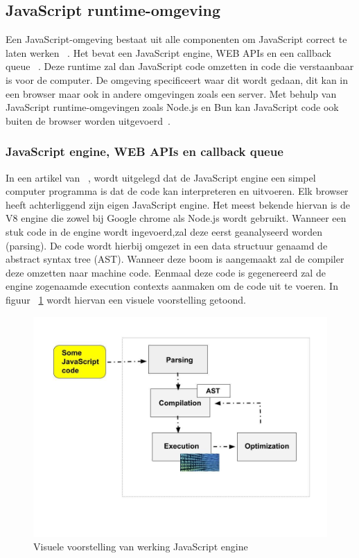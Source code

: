 \subsection{JavaScript runtime-omgeving}
Een JavaScript-omgeving bestaat uit alle componenten om JavaScript correct te laten werken ~\autocite{Christopher}. 
Het bevat een JavaScript engine, WEB APIs en een callback queue ~\autocite{Christopher}. 
Deze runtime zal dan JavaScript code omzetten in code die verstaanbaar is voor de computer.
De omgeving specificeert waar dit wordt gedaan, dit kan in een browser maar ook in andere omgevingen zoals een server.
Met behulp van JavaScript runtime-omgevingen zoals Node.js en Bun kan JavaScript code ook buiten de browser worden uitgevoerd~\autocite{Mozilla2023}.

\subsubsection{JavaScript engine, WEB APIs en callback queue}

In een artikel van ~\textcite{Christopher}, 
wordt uitgelegd dat de JavaScript engine een simpel computer programma is dat de code kan interpreteren en uitvoeren.
Elk browser heeft achterliggend zijn eigen JavaScript engine. Het meest bekende hiervan is de
V8 engine die zowel bij Google chrome als Node.js wordt gebruikt. 
Wanneer een stuk code in de engine wordt ingevoerd,zal deze eerst geanalyseerd worden (parsing). 
De code wordt hierbij omgezet in een data structuur genaamd de abstract syntax tree (AST).
Wanneer deze boom is aangemaakt zal de compiler deze omzetten naar machine code. 
Eenmaal deze code is gegenereerd zal de engine zogenaamde execution contexts aanmaken om de code uit te voeren.
In figuur ~\ref{fig:JavaScriptengine} wordt hiervan een visuele voorstelling getoond.
\begin{figure}[H]
    \centering
    \includegraphics[width=.9\textwidth]{graphics/javascriptengine.jpeg}
    \caption{\label{fig:JavaScriptengine}Visuele voorstelling van werking JavaScript engine ~\autocite{Christopher}}
\end{figure}

